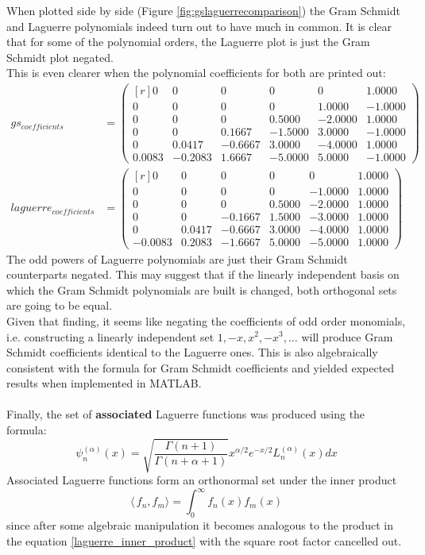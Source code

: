 \documentclass[a4paper]{article}
\numberwithin{equation}{section}
\begin{document}
\noindent When plotted side by side (Figure \ref{fig:gslaguerrecomparison}) the Gram Schmidt and Laguerre polynomials indeed turn out to have much in common. It is clear that for some of the polynomial orders, the Laguerre plot is just the Gram Schmidt plot negated. \\
This is even clearer when the polynomial coefficients for both are printed out:
\begin{align}
gs_{coefficients} &= 
\begin{pmatrix*}[r]
  0 & 0 & 0 & 0 & 0 & 1.0000 \\
  0 & 0 & 0 & 0 & 1.0000 & -1.0000 \\
  0 & 0 & 0 & 0.5000 & -2.0000 & 1.0000 \\
  0 & 0 & 0.1667 & -1.5000 & 3.0000 & -1.0000 \\
  0 & 0.0417 & -0.6667 & 3.0000 & -4.0000 & 1.0000 \\
  0.0083 & -0.2083 & 1.6667 & -5.0000 & 5.0000 & -1.0000
 \end{pmatrix*}
\\
laguerre_{coefficients} &= 
\begin{pmatrix*}[r]
  0 & 0 & 0 & 0 & 0 & 1.0000 \\
  0 & 0 & 0 & 0 & -1.0000 & 1.0000 \\
  0 & 0 & 0 & 0.5000 & -2.0000 & 1.0000 \\
  0 & 0 & -0.1667 & 1.5000 & -3.0000 & 1.0000 \\
  0 & 0.0417 & -0.6667 & 3.0000 & -4.0000 & 1.0000 \\
  -0.0083 & 0.2083 & -1.6667 & 5.0000 & -5.0000 & 1.0000
 \end{pmatrix*}
\end{align}
The odd powers of Laguerre polynomials are just their Gram Schmidt counterparts negated. This may suggest that if the linearly independent basis on which the Gram Schmidt polynomials are built is changed, both orthogonal sets are going to be equal. \\
Given that finding, it seems like negating the coefficients of odd order monomials, i.e. constructing a linearly independent set $1, -x, x^2, -x^3, \ldots$ will produce Gram Schmidt coefficients identical to the Laguerre ones. This is also algebraically consistent with the formula for Gram Schmidt coefficients and yielded expected results when implemented in MATLAB. \\
\\
Finally, the set of \textbf{associated} Laguerre functions was produced using the formula:
\begin{equation} \label{associated_laguerre_definition}
\psi_n^{(\alpha)}(x) = \sqrt{\frac{\Gamma(n+1)}{\Gamma(n+\alpha+1)}} x^{\alpha/2} e^{-x/2} L_n^{(\alpha)}(x) dx
\end{equation}
Associated Laguerre functions form an orthonormal set under the inner product \begin{equation} \label{inner_product}
\langle\,f_n, f_m \rangle = \int_{0}^{\infty}f_n(x)f_m(x)
\end{equation}
since after some algebraic manipulation it becomes analogous to the product in the equation \ref{laguerre_inner_product} with the square root factor cancelled out.
\end{document}
